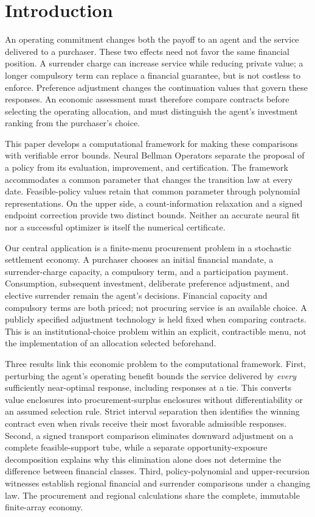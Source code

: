 \section{Introduction}
An operating commitment changes both the payoff to an agent and the service delivered to a purchaser. These two effects need not favor the same financial position. A surrender charge can increase service while reducing private value; a longer compulsory term can replace a financial guarantee, but is not costless to enforce. Preference adjustment changes the continuation values that govern these responses. An economic assessment must therefore compare contracts before selecting the operating allocation, and must distinguish the agent's investment ranking from the purchaser's choice.

This paper develops a computational framework for making these comparisons with verifiable error bounds. Neural Bellman Operators separate the proposal of a policy from its evaluation, improvement, and certification. The framework accommodates a common parameter that changes the transition law at every date. Feasible-policy values retain that common parameter through polynomial representations. On the upper side, a count-information relaxation and a signed endpoint correction provide two distinct bounds. Neither an accurate neural fit nor a successful optimizer is itself the numerical certificate.

Our central application is a finite-menu procurement problem in a stochastic settlement economy. A purchaser chooses an initial financial mandate, a surrender-charge capacity, a compulsory term, and a participation payment. Consumption, subsequent investment, deliberate preference adjustment, and elective surrender remain the agent's decisions. Financial capacity and compulsory terms are both priced; not procuring service is an available choice. A publicly specified adjustment technology is held fixed when comparing contracts. This is an institutional-choice problem within an explicit, contractible menu, not the implementation of an allocation selected beforehand.

Three results link this economic problem to the computational framework. First, perturbing the agent's operating benefit bounds the service delivered by \emph{every} sufficiently near-optimal response, including responses at a tie. This converts value enclosures into procurement-surplus enclosures without differentiability or an assumed selection rule. Strict interval separation then identifies the winning contract even when rivals receive their most favorable admissible responses. Second, a signed transport comparison eliminates downward adjustment on a complete feasible-support tube, while a separate opportunity-exposure decomposition explains why this elimination alone does not determine the difference between financial classes. Third, policy-polynomial and upper-recursion witnesses establish regional financial and surrender comparisons under a changing law. The procurement and regional calculations share the complete, immutable finite-array economy.

